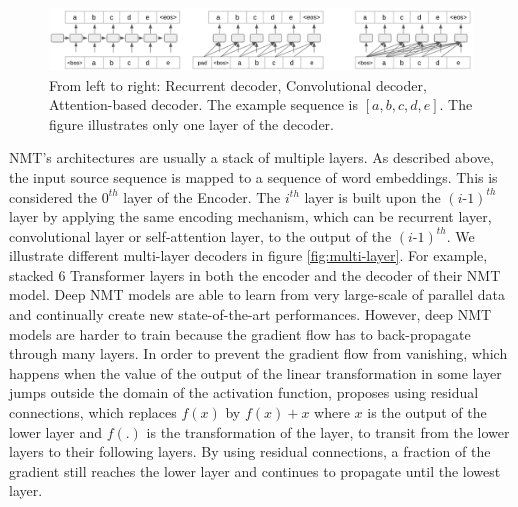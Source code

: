 \begin{figure}[htbp]
\includegraphics[width=\textwidth]{graphics/decoding.png}
\caption[Illustration of 3 most popular auto-regressive decoding paradigms]{From left to right: Recurrent decoder, Convolutional decoder, Attention-based decoder. The example sequence is $[a,b,c,d,e]$. The figure illustrates only one layer of the decoder.}
\label{fig:decoding}
\end{figure}

NMT's architectures are usually a stack of multiple layers. As described above, the input source sequence is mapped to a sequence of word embeddings. This is considered the $0^{th}$ layer of the Encoder. The $i^{th}$ layer is built upon the $(i\text{-}1)^{th}$ layer by applying the same encoding mechanism, which can be recurrent layer, convolutional layer or self-attention layer, to the output of the $(i\text{-}1)^{th}$. We illustrate different multi-layer decoders in figure \ref{fig:multi-layer}. For example, \citet{Vaswani17attention} stacked 6 Transformer layers in both the encoder and the decoder of their NMT model. Deep NMT models are able to learn from very large-scale of parallel data \citep{Ott18scaling} and continually create new state-of-the-art performances. However, deep NMT models are harder to train because the gradient flow has to back-propagate through many layers. In order to prevent the gradient flow from vanishing, which happens when the value of the output of the linear transformation in some layer jumps outside the domain of the activation function, \citep{He16deep} proposes using residual connections, which replaces $f(x)$ by $f(x)+x$ where $x$ is the output of the lower layer and $f(.)$ is the transformation of the layer, to transit from the lower layers to their following layers. By using residual connections, a fraction of the gradient still reaches the lower layer and continues to propagate until the lowest layer.

